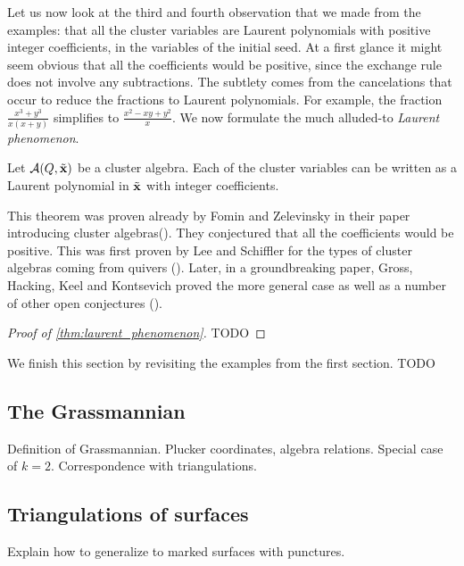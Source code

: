 Let us now look at the third and fourth observation that we made from the examples:
that all the cluster variables are Laurent polynomials with positive integer
coefficients, in the variables of the initial seed. At a first glance it might seem
obvious that all the coefficients would be positive, since the exchange rule does not
involve any subtractions. The subtlety comes from the cancelations that occur to reduce
the fractions to Laurent polynomials. For example, the fraction $\frac{x^3 +
		y^3}{x(x+y)}$ simplifies to $\frac{x^2 - xy + y^2}{x}$. We now formulate the much
alluded-to \emph{Laurent phenomenon}.
\begin{theorem}\label{thm:laurent_phenomenon}
	Let $\mathcal{A} (Q, \tilde{\mathbf{x}})$ be a cluster algebra. Each of the cluster variables can be written as a Laurent polynomial in $\tilde{\mathbf{x}}$ with integer coefficients.
\end{theorem}
This theorem was proven already by Fomin and Zelevinsky in their paper introducing cluster algebras(\cite[Theorem 3.1]{FominZelevinsky2002CAF}). They conjectured that all the coefficients would be positive. This was first proven by Lee and Schiffler for the types of cluster algebras coming from quivers (\cite{LeeSchiffler2015PositivityCA}). Later, in a groundbreaking paper, Gross, Hacking, Keel and Kontsevich proved the more general case as well as a number of other open conjectures (\cite{GrossHackingKeelKontsevich2018CanonicalBCA}).

\begin{proof}[Proof of \cref{thm:laurent_phenomenon}]
	TODO
\end{proof}

We finish this section by revisiting the examples from the first section. TODO

\subsection{The Grassmannian}
Definition of Grassmannian. Plucker coordinates, algebra relations. Special case of
$k=2$. Correspondence with triangulations.
\subsection{Triangulations of surfaces}
Explain how to generalize to marked surfaces with punctures.
